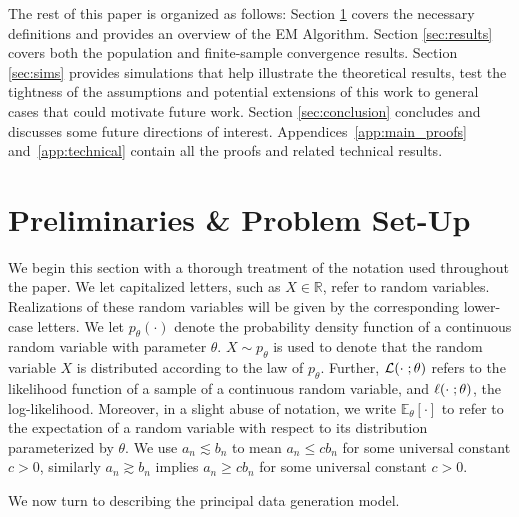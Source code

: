 \documentclass[runningheads]{llncs}
\begin{document}
The rest of this paper is organized as follows: Section \ref{sec:prelims} covers the
necessary definitions and provides an overview of the EM Algorithm. Section
\ref{sec:results} covers both the population and finite-sample convergence
results. Section \ref{sec:sims} provides simulations that help illustrate the
theoretical results, test the tightness of the assumptions and potential
extensions of this work to general cases that could motivate future work.
Section \ref{sec:conclusion} concludes and discusses some future directions of
interest. Appendices~\ref{app:main_proofs} and~\ref{app:technical} contain all
the proofs and related technical results.

% 
\section{Preliminaries \& Problem Set-Up}\label{sec:prelims}
We begin this section with a thorough treatment of the notation used throughout
the paper. We let capitalized letters, such as $X \in \mathbb{R}$, refer to
random variables.  Realizations of these random
variables will be given by the corresponding lower-case letters. We
let $p_\theta(\cdot)$ denote the probability density function of a continuous
random variable with parameter $\theta$. $X \sim p_\theta$ is used to denote
that the random variable $X$ is distributed according to the law of $p_\theta$.
Further, $\mathcal{L}(\cdot \hspace{1mm}; \theta)$ refers to the likelihood
function of a sample of a continuous random variable, and $\ell(\cdot
\hspace{1mm} ; \theta)$, the log-likelihood. Moreover, in a slight abuse of
notation, we write $\mathbb{E}_\theta[\cdot]$ to refer to the expectation of a
random variable with respect to its distribution parameterized by $\theta$.
We use $a_n \lesssim b_n$ to mean $a_n \leq cb_n$ for some universal constant
$c>0$, similarly $a_n \gtrsim b_n$ implies $a_n \geq cb_n$ for some universal
constant $c>0$.

We now turn to describing the principal data generation model.
\end{document}
